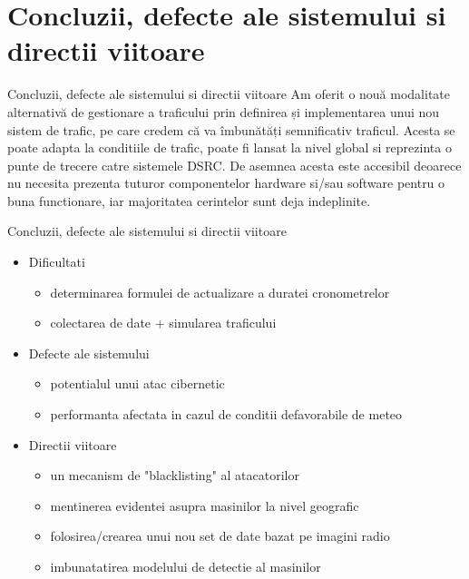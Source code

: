 \documentclass{beamer}
\begin{document}
\section{Concluzii, defecte ale sistemului si directii viitoare}
    \begin{frame}{Concluzii, defecte ale sistemului si directii viitoare}
        Am oferit o nouă modalitate alternativă de gestionare a traficului
        prin definirea și implementarea unui nou sistem de trafic,
        pe care credem că va îmbunătăți semnificativ traficul. Acesta 
        se poate adapta la conditiile de trafic, poate fi lansat la nivel global si 
        reprezinta o punte de trecere catre sistemele DSRC. De asemnea acesta 
        este accesibil deoarece nu necesita prezenta tuturor componentelor 
        hardware si/sau software pentru o buna functionare, iar majoritatea 
        cerintelor sunt deja indeplinite.
    \end{frame}

    \begin{frame}{Concluzii, defecte ale sistemului si directii viitoare}
        \begin{itemize}[<+-| alert@+>]
            \item Dificultati
            \begin{itemize}
                \item determinarea formulei de actualizare a duratei cronometrelor
                \item colectarea de date + simularea traficului
            \end{itemize} 
            \item Defecte ale sistemului
            \begin{itemize}
                \item potentialul unui atac cibernetic
                \item performanta afectata in cazul de conditii defavorabile de meteo
            \end{itemize}
            \item Directii viitoare
            \begin{itemize}
                \item un mecanism de "blacklisting" al atacatorilor
                \item mentinerea evidentei asupra masinilor la nivel geografic
                \item folosirea/crearea unui nou set de date bazat pe imagini radio
                \item imbunatatirea modelului de detectie al masinilor 
            \end{itemize}
        \end{itemize}
    \end{frame}
\end{document}
